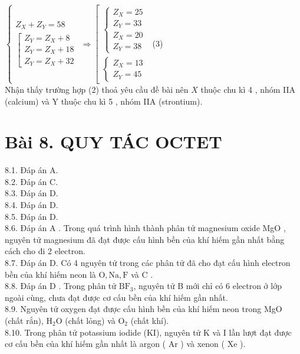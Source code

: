 \documentclass[10pt]{article}
\begin{document}
$\left\{\begin{array}{l}Z_{X}+Z_{Y}=58 \\ {\left[\begin{array}{l}Z_{Y}=Z_{X}+8 \\ Z_{Y}=Z_{X}+18 \\ Z_{Y}=Z_{X}+32\end{array}\right.}\end{array} \Rightarrow\left[\begin{array}{l}\left\{\begin{array}{l}Z_{X}=25 \\ Z_{Y}=33 \\ Z_{X}=20 \\ Z_{Y}=38\end{array}\right. \\ \left\{\begin{array}{l}Z_{X}=13 \\ Z_{Y}=45\end{array}\right.\end{array}\right.\right.$ (3)\\
Nhận thấy trường hợp (2) thoả yêu cầu đề bài nên $X$ thuộc chu kì 4 , nhóm IIA (calcium) và Y thuộc chu kì 5 , nhóm IIA (strontium).

\section*{Bài 8. QUY TÁC OCTET}
8.1. Đáp án A.\\
8.2. Đáp án C.\\
8.3. Đáp án D.\\
8.4. Đáp án D.\\
8.5. Đáp án D.\\
8.6. Đáp án A . Trong quá trình hình thành phân tử magnesium oxide MgO , nguyên tử magnesium đã đạt được cấu hình bền của khí hiếm gần nhất bằng cách cho đi 2 electron.\\
8.7. Đáp án D. Có 4 nguyên tử trong các phân tử đã cho đạt cấu hình electron bền của khí hiếm neon là $\mathrm{O}, \mathrm{Na}, \mathrm{F}$ và C .\\
8.8. Đáp án D . Trong phân tử $\mathrm{BF}_{3}$, nguyên tử B mới chỉ có 6 electron ở lớp ngoài cùng, chưa đạt được cơ cấu bền của khí hiếm gần nhất.\\
8.9. Nguyên tử oxygen đạt được cấu hình bền của khí hiếm neon trong MgO (chất rắn), $\mathrm{H}_{2} \mathrm{O}$ (chất lỏng) và $\mathrm{O}_{2}$ (chất khí).\\
8.10. Trong phân tử potassium iodide (KI), nguyên tử K và I lần lượt đạt được cơ cấu bền của khí hiếm gần nhất là argon ( Ar ) và xenon ( Xe ).
\end{document}
